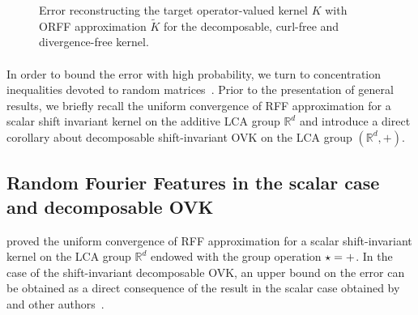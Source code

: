\begin{figure}[!ht]
    \centering
    \caption[\acs{ORFF} reconstruction error]{Error reconstructing the target
    operator-valued kernel $K$ with \acs{ORFF}
    approximation $\tilde{K}$ for the decomposable, curl-free and
    divergence-free kernel.}
    \label{fig:approximation_error}
\end{figure}
\paragraph{}
In order to bound the error with high probability, we turn to concentration
inequalities devoted to random matrices~\citep{Boucheron}. Prior to the
presentation of general results, we briefly recall the uniform convergence of
\acs{RFF} approximation for a scalar shift invariant kernel on the additive
\acs{LCA} group $\mathbb{R}^d$ and introduce a direct corollary about
decomposable shift-invariant \acs{OVK} on the \acs{LCA} group $(\mathbb{R}^d,
+)$.

\subsection{Random Fourier Features in the scalar case and decomposable OVK}
\citet{Rahimi2007} proved the uniform convergence of \acf{RFF} approximation
for a scalar shift-invariant kernel on the \acs{LCA} group $\mathbb{R}^d$
endowed with the group operation $\star=+$. In the case of the
shift-invariant decomposable \acs{OVK}, an upper bound on the error can be
obtained as a direct consequence of the result in the scalar case obtained
by~\citet{Rahimi2007} and other authors~\citep{sutherland2015, sriper2015}.

